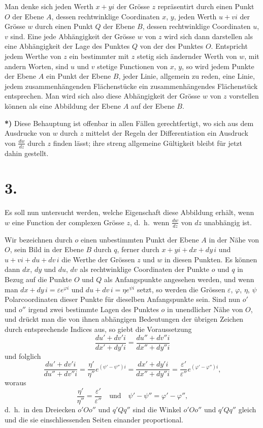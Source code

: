 \documentclass{article}
\begin{document}
Man denke sich jeden Werth $x + yi$ der Grösse $z$ repräsentirt durch einen Punkt $O$ der Ebene $A$, dessen rechtwinklige Coordinaten $x$, $y$, jeden Werth $u + vi$ der Grösse $w$ durch einen Punkt $Q$ der Ebene $B$, dessen rechtwinklige Coordinaten $u$, $v$ sind. Eine jede Abhängigkeit der Grösse $w$ von $z$ wird sich dann darstellen als eine Abhängigkeit der Lage des Punktes $Q$ von der des Punktes $O$. Entspricht jedem Werthe von $z$ ein bestimmter mit $z$ stetig sich ändernder Werth von $w$, mit andern Worten, sind $u$ und $v$ stetige Functionen von $x$, $y$, so wird jedem Punkte der Ebene $A$ ein Punkt der Ebene $B$, jeder Linie, allgemein zu reden, eine Linie, jedem zusammenhängenden Flächenstücke ein zusammenhängendes Flächenstück entsprechen. Man wird sich also diese Abhängigkeit der Grösse $w$ von $z$ vorstellen können als eine Abbildung der Ebene $A$ auf der Ebene $B$.

\textbf{*)} Diese Behauptung ist offenbar in allen Fällen gerechtfertigt, wo sich aus dem Ausdrucke von $w$ durch $z$ mittelst der Regeln der Differentiation ein Ausdruck von $\frac{dw}{dz}$ durch $z$ finden lässt; ihre streng allgemeine Gültigkeit bleibt für jetzt dahin gestellt.

\section*{3.}

Es soll nun untersucht werden, welche Eigenschaft diese Abbildung erhält, wenn $w$ eine Function der complexen Grösse $z$, d.\ h.\ wenn $\frac{dw}{dz}$ von $dz$ unabhängig ist.

Wir bezeichnen durch $o$ einen unbestimmten Punkt der Ebene $A$ in der Nähe von $O$, sein Bild in der Ebene $B$ durch $q$, ferner durch $x + yi + dx + dy\,i$ und $u + vi + du + dv\,i$ die Werthe der Grössen $z$ und $w$ in diesen Punkten. Es können dann $dx$, $dy$ und $du$, $dv$ als rechtwinklige Coordinaten der Punkte $o$ und $q$ in Bezug auf die Punkte $O$ und $Q$ als Anfangspunkte angesehen werden, und wenn man $dx + dy\,i = \varepsilon e^{\varphi i}$ und $du + dv\,i = \eta e^{\psi i}$ setzt, so werden die Grössen $\varepsilon$, $\varphi$, $\eta$, $\psi$ Polarcoordinaten dieser Punkte für dieselben Anfangspunkte sein. Sind nun $o'$ und $o''$ irgend zwei bestimmte Lagen des Punktes $o$ in unendlicher Nähe von $O$, und drückt man die von ihnen abhängigen Bedeutungen der übrigen Zeichen durch entsprechende Indices aus, so giebt die Voraussetzung
\[
\frac{du' + dv'i}{dx' + dy'i} = \frac{du'' + dv''i}{dx'' + dy''i}
\]
und folglich
\[
\frac{du' + dv'i}{du'' + dv''i} = \frac{\eta'}{\eta''} e^{(\psi' - \psi'')i} = \frac{dx' + dy'i}{dx'' + dy''i} = \frac{\varepsilon'}{\varepsilon''} e^{(\varphi' - \varphi'')i},
\]
woraus
\[
\frac{\eta'}{\eta''} = \frac{\varepsilon'}{\varepsilon''} \quad \text{und} \quad \psi' - \psi'' = \varphi' - \varphi'',
\]
d.\ h.\ in den Dreiecken $o'Oo''$ und $q'Qq''$ sind die Winkel $o'Oo''$ und $q'Qq''$ gleich und die sie einschliessenden Seiten einander proportional.
\end{document}
